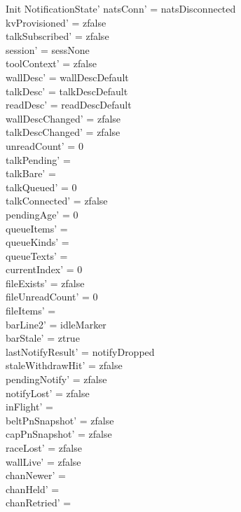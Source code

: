 \documentclass[a4paper,10pt,fleqn]{article}
\begin{document}
\begin{schema}{Init}
  NotificationState'
  \where
  natsConn' = natsDisconnected \\
  kvProvisioned' = zfalse \\
  talkSubscribed' = zfalse \\
  session' = sessNone \\
  toolContext' = zfalse \\
  wallDesc' = wallDescDefault \\
  talkDesc' = talkDescDefault \\
  readDesc' = readDescDefault \\
  wallDescChanged' = zfalse \\
  talkDescChanged' = zfalse \\
  unreadCount' = 0 \\
  talkPending' = \emptyset \\
  talkBare' = \emptyset \\
  talkQueued' = 0 \\
  talkConnected' = zfalse \\
  pendingAge' = 0 \\
  queueItems' = \langle \rangle \\
  queueKinds' = \emptyset \\
  queueTexts' = \emptyset \\
  currentIndex' = 0 \\
  fileExists' = zfalse \\
  fileUnreadCount' = 0 \\
  fileItems' = \langle \rangle \\
  barLine2' = idleMarker \\
  barStale' = ztrue \\
  lastNotifyResult' = notifyDropped \\
  staleWithdrawHit' = zfalse \\
  pendingNotify' = zfalse \\
  notifyLost' = zfalse \\
  inFlight' = \emptyset \\
  beltPnSnapshot' = zfalse \\
  capPnSnapshot' = zfalse \\
  raceLost' = zfalse \\
  wallLive' = zfalse \\
  chanNewer' = \emptyset \\
  chanHeld' = \emptyset \\
  chanRetried' = \emptyset \\

\end{schema}
\end{document}
